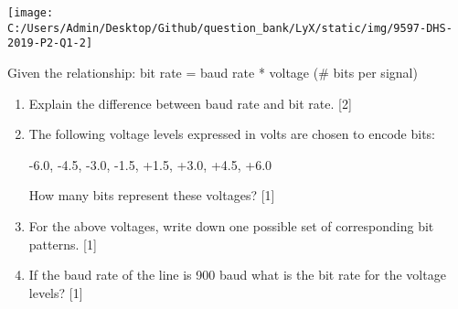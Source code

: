 \begin{center}
\texttt{[image: C:/Users/Admin/Desktop/Github/question\_bank/LyX/static/img/9597-DHS-2019-P2-Q1-2]}
\par\end{center}
\item[(f)]  Given the relationship: bit rate = baud rate {*} voltage (\# bits
per signal)
\begin{enumerate}
\item Explain the difference between baud rate and bit rate. \hfill{}{[}2{]}
\item The following voltage levels expressed in volts are chosen to encode
bits:

-6.0, -4.5, -3.0, -1.5, +1.5, +3.0, +4.5, +6.0

How many bits represent these voltages?\hfill{} {[}1{]}
\item For the above voltages, write down one possible set of corresponding
bit patterns.\hfill{} {[}1{]}
\item If the baud rate of the line is 900 baud what is the bit rate for
the voltage levels?\hfill{} {[}1{]}
\end{enumerate}